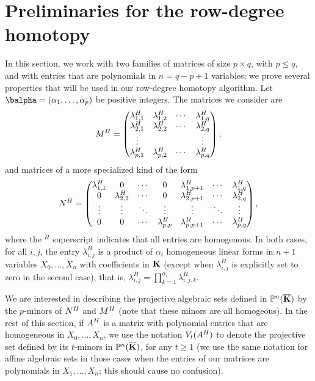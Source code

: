 \documentclass[12pt]{article}
\begin{document}

\section{Preliminaries for the row-degree homotopy}\label{sec:prel-row}

In this section, we work with two families of matrices of size $p
\times q$, with $p \le q$, and with entries that are polynomials in
$n=q-p+1$ variables; we prove several properties that will be used 
in our row-degree homotopy algorithm. Let $\balpha=(\alpha_1,\dots,\alpha_p)$
be positive integers. The matrices we consider are
\begin{align}\label{eqdef:type2}
{M}^H= \left( \begin{matrix}
\lambda^H_{1,1} & \lambda^H_{1,2} & \cdots & \lambda^H_{1, q}\\
 \lambda^H_{2,1} &  \lambda^H_{2,2} & \cdots & \lambda^H_{2, q}\\
 \vdots & & & \vdots\\
 \lambda^H_{p,1} &  \lambda^H_{p,2}& \cdots & \lambda^H_{p, q}
\end{matrix} \right),
\end{align}
and matrices of a more specialized kind of the form
\begin{align}\label{eqdef:type1}
{N}^H= \left( \begin{matrix}
\lambda^H_{1,1} & 0 & \cdots & 0 & \lambda^H_{1,p+1} & \cdots & \lambda^H_{1, q}\\
0 & \lambda^H_{2,2} & \cdots & 0 & \lambda^H_{2,p+1} & \cdots & \lambda^H_{2, q}\\
\vdots & \vdots & \ddots & \vdots & \vdots & \ddots & \vdots\\
0 & 0 & \cdots & \lambda^H_{p,p} & \lambda^H_{p,p+1} & \cdots & \lambda^H_{p, q}
\end{matrix} \right),
\end{align}
where the ${}^H$ superscript indicates that all entries are
homogenous.  In both cases, for all $i,j$, the entry $\lambda^H_{i,j}$
is a product of $\alpha_i$ homogeneous linear forms in $n+1$ variables
$X_0,\dots,X_n$ with coefficients in $\mathbf{K}$ (except when
$\lambda^H_{i,j}$ is explicitly set to zero in the second case), that
is, $\lambda^H_{i,j}=\prod_{k=1}^{\alpha_i} \lambda^H_{i,j,k}$.  

We are interested in describing the projective algebraic sets defined
in $\mathbb{P}^n(\overline{\mathbf{K}})$ by the $p$-minors of ${N}^H$ and ${M}^H$ (note that
these minors are all homogeous). In the rest of this section, if
${A}^H$ is a matrix with polynomial entries that are homogeneous in
$X_0,\dots,X_n$, we use the notation $V_t({A}^H)$ to denote the
projective set defined by its $t$-minors in $\mathbb{P}^n(\overline{\mathbf{K}})$, for any
$t\ge 1$ (we use the same notation for affine algebraic sets in those
cases when the entries of our matrices are polynomials in $X_1,\dots,X_n$;
this should cause no confusion).
\end{document}
